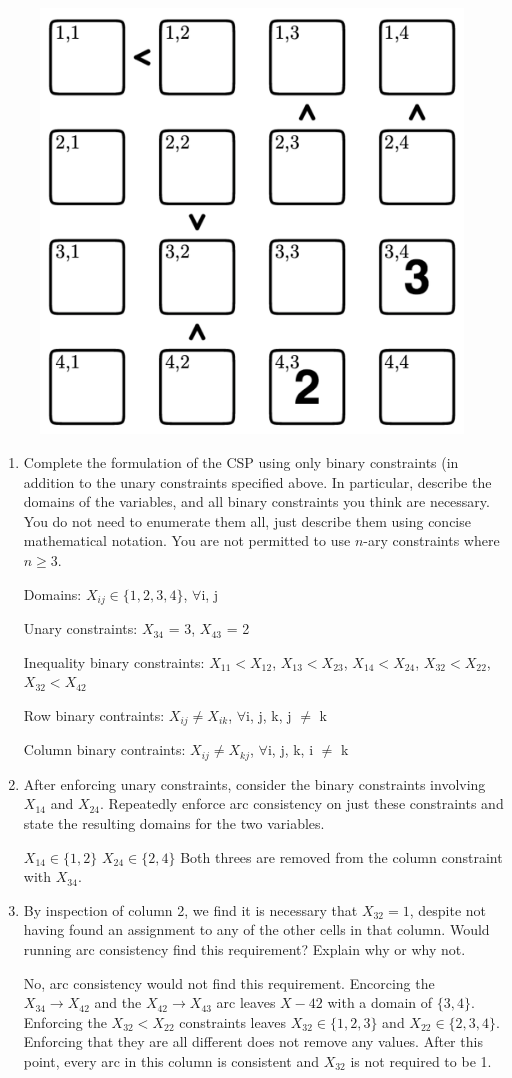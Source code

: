 \documentclass[12pt]{article}
\theoremstyle{case}
\begin{document}
\begin{figure}[h]
\includegraphics[width=.37\textwidth]{assignment4_1.png}
\centering
\end{figure}
 
    
\begin{enumerate} [label=(\alph*)]
    \item
    Complete the formulation of the CSP using only binary constraints (in addition to the unary constraints specified above. In particular, describe the domains of the variables, and all binary constraints you think are necessary. You do not need to enumerate them all, just describe them using concise mathematical notation. You are not permitted to use $n$-ary constraints where $n \geq 3$.
   
Domains:  $X_{ij} \in \{1, 2, 3, 4\}$, $\forall$i, j

Unary constraints: $X_{34}$ = 3, $X_{43}$ = 2

Inequality binary constraints: $X_{11} < X_{12}$, $X_{13} < X_{23}$, $X_{14} < X_{24}$, $X_{32}< X_{22}$, $X_{32}< X_{42}$

Row binary contraints:  $X_{ij} \neq X_{ik}$, $\forall$i, j, k, j $\neq$ k

Column binary contraints:  $X_{ij} \neq X_{kj}$, $\forall$i, j, k, i $\neq$ k


    \item 
    After enforcing unary constraints, consider the binary constraints involving $X_{14}$ and $X_{24}$. Repeatedly enforce arc consistency on just these constraints and state the resulting domains for the two variables.

    
$X_{14} \in \{1, 2\}$
$X_{24} \in \{2, 4\}$
Both threes are removed from the column constraint with $X_{34}$.


    
    \item
    By inspection of column 2, we find it is necessary that $X_{32} = 1$, despite not having found an assignment to any of the other cells in that column. Would running arc consistency find this requirement? Explain why or why not.
    
No, arc consistency would not find this requirement. Encorcing the $X_{34} \rightarrow X_{42}$ and the $X_{42} \rightarrow X_{43}$ arc leaves $X-{42}$ with a domain of $\{3, 4\}$. Enforcing the $X_{32} < X_{22}$ constraints leaves $X_{32} \in \{1, 2, 3\}$ and $X_{22} \in \{2, 3, 4\}$. Enforcing that they are all different does not remove any values. After this point, every arc in this column is consistent and $X_{32}$ is not required to be 1.
   
\end{enumerate}
\end{document}
